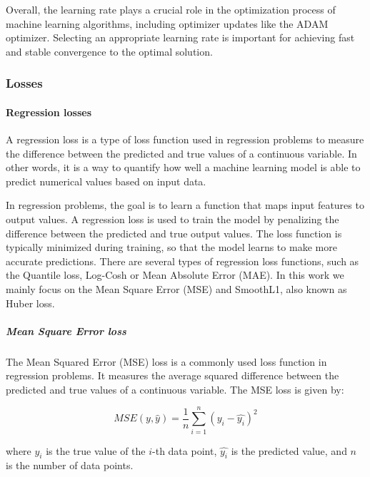 Overall, the learning rate plays a crucial role in the optimization process of machine learning algorithms, including optimizer updates like the ADAM optimizer. Selecting an appropriate learning rate is important for achieving fast and stable convergence to the optimal solution.

\subsubsection{Losses}
\label{subsubsec:3_losses}

\paragraph{Regression losses}
\label{par:3_regressions_losses}


A regression loss is a type of loss function used in regression problems to measure the difference between the predicted and true values of a continuous variable. In other words, it is a way to quantify how well a machine learning model is able to predict numerical values based on input data.

In regression problems, the goal is to learn a function that maps input features to output values. A regression loss is used to train the model by penalizing the difference between the predicted and true output values. The loss function is typically minimized during training, so that the model learns to make more accurate predictions. There are several types of regression loss functions, such as the Quantile loss, Log-Cosh or Mean Absolute Error (MAE). In this work we mainly focus on the Mean Square Error (MSE) and SmoothL1, also known as Huber loss.

\subparagraph{Mean Square Error loss}
\label{subpar:3_mse_loss}

The Mean Squared Error (MSE) loss is a commonly used loss function in regression problems. It measures the average squared difference between the predicted and true values of a continuous variable. The MSE loss is given by:

\begin{equation}
	MSE(y, \hat{y}) = \frac{1}{n}\sum_{i=1}^{n}(y_i - \hat{y_i})^2
\end{equation}

where $y_i$ is the true value of the $i$-th data point, $\hat{y_i}$ is the predicted value, and $n$ is the number of data points.

